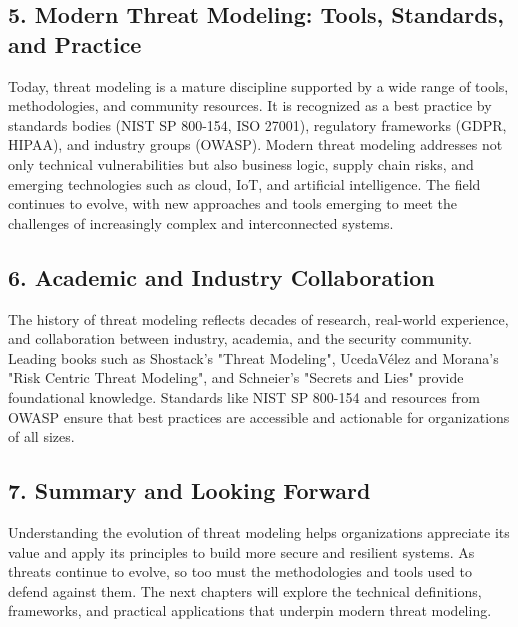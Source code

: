 \subsection*{5. Modern Threat Modeling: Tools, Standards, and Practice}
Today, threat modeling is a mature discipline supported by a wide range of tools, methodologies, and community resources. It is recognized as a best practice by standards bodies (NIST SP 800-154\cite{nist800154}, ISO 27001), regulatory frameworks (GDPR, HIPAA), and industry groups (OWASP\cite{owasp}). Modern threat modeling addresses not only technical vulnerabilities but also business logic, supply chain risks, and emerging technologies such as cloud, IoT, and artificial intelligence. The field continues to evolve, with new approaches and tools emerging to meet the challenges of increasingly complex and interconnected systems.

\subsection*{6. Academic and Industry Collaboration}
The history of threat modeling reflects decades of research, real-world experience, and collaboration between industry, academia, and the security community. Leading books such as Shostack’s "Threat Modeling"\cite{shostack2014}, UcedaVélez and Morana’s "Risk Centric Threat Modeling"\cite{uceda2015}, and Schneier’s "Secrets and Lies"\cite{schneier1999} provide foundational knowledge. Standards like NIST SP 800-154\cite{nist800154} and resources from OWASP\cite{owasp} ensure that best practices are accessible and actionable for organizations of all sizes.

\subsection*{7. Summary and Looking Forward}
Understanding the evolution of threat modeling helps organizations appreciate its value and apply its principles to build more secure and resilient systems. As threats continue to evolve, so too must the methodologies and tools used to defend against them. The next chapters will explore the technical definitions, frameworks, and practical applications that underpin modern threat modeling.
